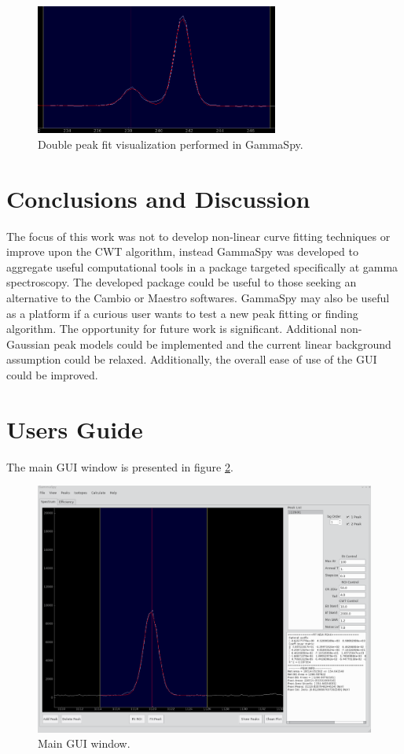 \documentclass[10pt]{article}
\begin{document}
\begin{figure}[!htbp]
\centering
\includegraphics[width=8cm]{images/gspy2_ex.png}
\caption{Double peak fit visualization performed in GammaSpy.}
\label{gui}
\end{figure}

\pagebreak
\section{Conclusions and Discussion}

The focus of this work was not to develop non-linear curve fitting techniques or improve upon the CWT algorithm,
instead GammaSpy was developed to aggregate useful computational tools in a package
targeted specifically at gamma spectroscopy. The developed package could be useful to those seeking
an alternative to the Cambio or Maestro softwares.  GammaSpy may also be useful as a platform if a curious user
wants to test a new peak fitting or finding algorithm.  The opportunity for
future work is significant.  Additional non-Gaussian peak models could be implemented and the
current linear background assumption could be relaxed.  Additionally, the overall ease of use of the
GUI could be improved.

\pagebreak
\section{Users Guide}
\label{ug}

The main GUI window is presented in figure \ref{gui}.
\begin{figure}[!htbp]
\centering
\includegraphics[width=14cm]{images/gui.png}
\caption{Main GUI window.}
\label{gui}
\end{figure}
\end{document}
